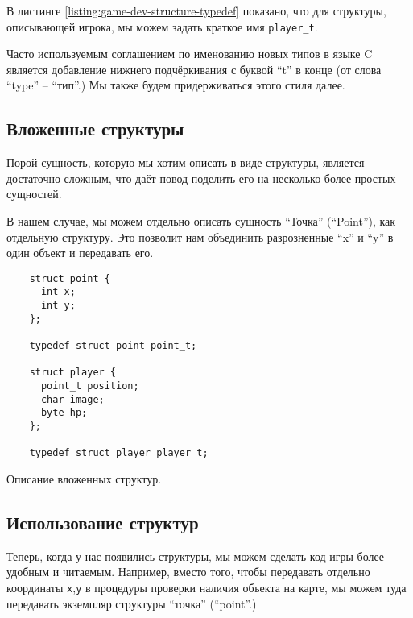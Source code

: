 \documentclass[../sparc.tex]{subfiles}
\begin{document}
В листинге \ref{listing:game-dev-structure-typedef} показано, что для структуры,
описывающей игрока, мы можем задать краткое имя \texttt{player\_t}.

Часто используемым соглашением по именованию новых типов в языке C является
добавление нижнего подчёркивания с буквой ``t'' в конце (от слова ``type'' --
``тип''.)  Мы также будем придерживаться этого стиля далее.

\subsection{Вложенные структуры}

Порой сущность, которую мы хотим описать в виде структуры, является достаточно
сложным, что даёт повод поделить его на несколько более простых сущностей.

В нашем случае, мы можем отдельно описать сущность ``Точка'' (``Point''), как
отдельную структуру.  Это позволит нам объединить разрозненные ``x'' и ``y'' в
один объект и передавать его.

\begin{listing}[H]
  \begin{verbatim}
    struct point {
      int x;
      int y;
    };

    typedef struct point point_t;

    struct player {
      point_t position;
      char image;
      byte hp;
    };

    typedef struct player player_t;
  \end{verbatim}
  \caption{Описание вложенных структур.}
  \label{listing:game-dev-nested-structures}
\end{listing}

\subsection{Использование структур}

Теперь, когда у нас появились структуры, мы можем сделать код игры более удобным
и читаемым. Например, вместо того, чтобы передавать отдельно координаты
\texttt{x},\texttt{y} в процедуры проверки наличия объекта на карте, мы можем
туда передавать экземпляр структуры ``точка'' (``point''.)
\end{document}
